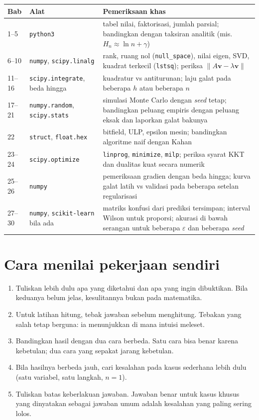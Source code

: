 \begin{center}
\small
\begin{tabular}{@{}llp{7.2cm}@{}}
\toprule
\textbf{Bab} & \textbf{Alat} & \textbf{Pemeriksaan khas} \\
\midrule
1--5 & \texttt{python3} & tabel nilai, faktorisasi, jumlah parsial; bandingkan
  dengan taksiran analitik (mis. $H_n\approx\ln n+\gamma$) \\
6--10 & \texttt{numpy}, \texttt{scipy.linalg} & rank, ruang nol (\texttt{null\_space}),
  nilai eigen, SVD, kuadrat terkecil (\texttt{lstsq}); periksa
  $\|A\mathbf{v}-\lambda\mathbf{v}\|$ \\
11--16 & \texttt{scipy.integrate}, beda hingga & kuadratur vs antiturunan; laju
  galat pada beberapa $h$ atau beberapa $n$ \\
17--21 & \texttt{numpy.random}, \texttt{scipy.stats} & simulasi Monte Carlo dengan
  \emph{seed} tetap; bandingkan peluang empiris dengan peluang eksak dan
  laporkan galat bakunya \\
22 & \texttt{struct}, \texttt{float.hex} & bitfield, ULP, epsilon mesin;
  bandingkan algoritme naif dengan Kahan \\
23--24 & \texttt{scipy.optimize} & \texttt{linprog}, \texttt{minimize},
  \texttt{milp}; periksa syarat KKT dan dualitas kuat secara numerik \\
25--26 & \texttt{numpy} & pemeriksaan gradien dengan beda hingga; kurva galat
  latih vs validasi pada beberapa setelan regularisasi \\
27--30 & \texttt{numpy}, \texttt{scikit-learn} bila ada & matriks konfusi dari
  prediksi tersimpan; interval Wilson untuk proporsi; akurasi di bawah serangan
  untuk beberapa $\varepsilon$ dan beberapa \emph{seed} \\
\bottomrule
\end{tabular}
\end{center}

\section*{Cara menilai pekerjaan sendiri}

\begin{enumerate}
  \item Tuliskan lebih dulu apa yang diketahui dan apa yang ingin dibuktikan.
        Bila keduanya belum jelas, kesulitannya bukan pada matematika.
  \item Untuk latihan hitung, tebak jawaban sebelum menghitung. Tebakan yang salah
        tetap berguna: ia menunjukkan di mana intuisi meleset.
  \item Bandingkan hasil dengan dua cara berbeda. Satu cara bisa benar karena
        kebetulan; dua cara yang sepakat jarang kebetulan.
  \item Bila hasilnya berbeda jauh, cari kesalahan pada kasus sederhana lebih dulu
        (satu variabel, satu langkah, $n=1$).
  \item Tuliskan batas keberlakuan jawaban. Jawaban benar untuk kasus khusus yang
        dinyatakan sebagai jawaban umum adalah kesalahan yang paling sering lolos.
\end{enumerate}
